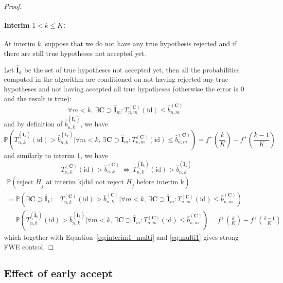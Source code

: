 \documentclass{article}
\theoremstyle{plain}
\theoremstyle{remark}
\renewcommand{\P}{\mathbb{P}}
\newcommand{\1}{\mathbbm{1}}
\newcommand{\id}{\mathrm{id}}
\numberwithin{equation}{section}
\begin{document}
\begin{proof}
\paragraph{Interim $1<k\le  K$:}

At interim $k$, suppose that we do not have any true hypothesis rejected and if there are still true hypotheses not accepted yet.

Let $\widehat{\textbf{I}}_k$ be the set of true hypotheses not accepted yet, then all the probabilities computed in the algorithm are conditioned on not having rejected any true hypotheses and not having accepted all true hypotheses (otherwise the error is $0$ and the result is true):
$$\forall m < k, \, \exists \textbf{C} \supset \widehat{\textbf{I}}_m  : T_{n,m}^{(\textbf{C})}(\id) \le \widehat{b}_{n,m}^{(\textbf{C})}.$$
and by definition of $\widehat{b}_{n,k}^{(\widehat{\textbf{I}}_k)}$, we have
$$\P\left( T_{n,k}^{(\widehat{\textbf{I}}_k)}(\id)> \widehat{b}_{n,k}^{(\widehat{\textbf{I}}_k)} \Big|\forall m < k, \, \exists \textbf{C} \supset \widehat{\textbf{I}}_m  : T_{n,m}^{(\textbf{C})}(\id) \le \widehat{b}_{n,m}^{(\textbf{C})}\right) = f^+\left(\frac{k}{K}\right)-f^+\left(\frac{k-1}{K}\right) $$
and similarly to interim 1, we have 
$$T_{n,k}^{(\textbf{C})}(\id)> \widehat{b}_{n,k}^{(\textbf{C})}\, \Leftrightarrow \,
 T_{n,k}^{(\widehat{\textbf{I}}_k)}(\id) > \widehat{b}_{n,k}^{(\widehat{\textbf{I}}_k)} $$
 \begin{multline*}
\P\left(\text{reject }H_{\widehat{j}} \text{ at interim k} \Big| \text{did not reject }H_{\widehat{j}} \text{ before interim k}\right)\\
= \P\left( \exists \textbf{C} \supset \widehat{\textbf{I}}_k :\quad  T_{n,k}^{(\textbf{C})}(\id)> \widehat{b}_{n,k}^{(\textbf{C})} \Big|  \forall m < k, \, \exists \textbf{C} \supset \widehat{\textbf{I}}_m  : T_{n,m}^{(\textbf{C})}(\id) \le \widehat{b}_{n,m}^{(\textbf{C})}\right)\\
= \P\left(T_{n,k}^{(\widehat{\textbf{I}}_k)}(\id) > \widehat{b}_{n,k}^{(\widehat{\textbf{I}}_k)}\Big|  \forall m < k, \, \exists \textbf{C} \supset \widehat{\textbf{I}}_m  : T_{n,m}^{(\textbf{C})}(\id) \le \widehat{b}_{n,m}^{(\textbf{C})} \right)
 = f^+\left(\frac{k}{K}\right)-f^+\left(\frac{k-1}{K}\right)
\end{multline*}
which together with Equation~\eqref{eq:interim1_multi} and \eqref{eq:multi1} gives strong FWE control.
\end{proof}

\subsection{Effect of early accept}
\end{document}

